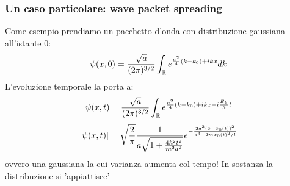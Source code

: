 \subsubsection*{Un caso particolare: wave packet spreading} 
Come esempio prendiamo un pacchetto d'onda con distribuzione gaussiana all'istante 0:
\[
    \psi(x, 0) = \frac{\sqrt a}{(2\pi)^{3/2}}\int_{\mathbb{R}} e^{\frac{a^2}{4}(k - k_0) + ikx} dk
\]
L'evoluzione temporale la porta a:
\[
    \psi(x, t) = \frac{\sqrt a}{(2\pi)^{3/2}}\int_{\mathbb{R}} e^{\frac{a^2}{4}(k - k_0) + ikx -i\frac{E_k}{\hslash}t}\]\[
    |\psi(x,t)| = \sqrt{\frac{2}{\pi}}\frac{1}{a\sqrt{1 + \frac{4\hslash^2t^2}{m^2a^2}}}e^{-\frac{2a^2(x-x_0(t))^2}{a^4+2mx_0(t)^2/l}}
\]
ovvero una gaussiana la cui varianza aumenta col tempo! In sostanza la distribuzione si 'appiattisce'
\begin{figure}[h]
\centering
{}
\end{figure}
